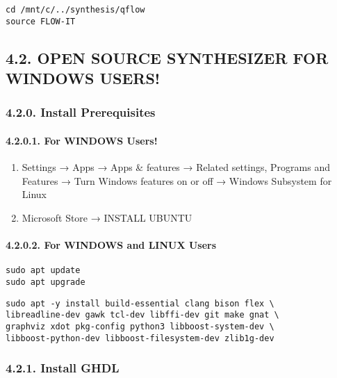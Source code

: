 \documentclass[]{article}
\let\oldparagraph\paragraph
\renewcommand{\paragraph}[1]{\oldparagraph{#1}\mbox{}}
\begin{document}
\begin{verbatim}
cd /mnt/c/../synthesis/qflow
source FLOW-IT
\end{verbatim}

\subsection{4.2. OPEN SOURCE SYNTHESIZER FOR WINDOWS
USERS!}\label{open-source-synthesizer-for-windows-users}

\subsubsection{4.2.0. Install
Prerequisites}\label{install-prerequisites-1}

\paragraph{4.2.0.1. For WINDOWS Users!}\label{for-windows-users}

\begin{enumerate}
\def\labelenumi{\arabic{enumi}.}
\item
  Settings → Apps → Apps \& features → Related settings, Programs and
  Features → Turn Windows features on or off → Windows Subsystem for
  Linux
\item
  Microsoft Store → INSTALL UBUNTU
\end{enumerate}

\paragraph{4.2.0.2. For WINDOWS and LINUX
Users}\label{for-windows-and-linux-users}

\begin{verbatim}
sudo apt update
sudo apt upgrade
\end{verbatim}

\begin{verbatim}
sudo apt -y install build-essential clang bison flex \
libreadline-dev gawk tcl-dev libffi-dev git make gnat \
graphviz xdot pkg-config python3 libboost-system-dev \
libboost-python-dev libboost-filesystem-dev zlib1g-dev
\end{verbatim}

\subsubsection{4.2.1. Install GHDL}\label{install-ghdl}
\end{document}
